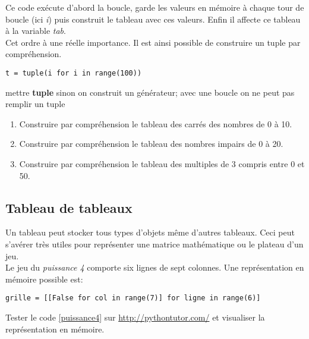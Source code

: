 \documentclass[a4paper,11pt]{article}
\begin{document}
\begin{Form}
Ce code exécute d'abord la boucle, garde les valeurs en mémoire à chaque tour de boucle (ici \emph{i}) puis construit le tableau avec ces valeurs. Enfin il affecte ce tableau à la variable \emph{tab}.\\
Cet ordre à une réelle importance. Il est ainsi possible de construire un tuple par compréhension.
\begin{code}[!h]
\begin{lstlisting}
t = tuple(i for i in range(100))	
\end{lstlisting}
\label{tuple}
\end{code}
\begin{commentprof}
mettre \textbf{tuple} sinon on construit un générateur; avec une boucle on ne peut pas remplir un tuple
\end{commentprof}
\begin{activite}
\begin{enumerate}
\item Construire par compréhension le tableau des carrés des nombres de 0 à 10.
\item Construire par compréhension le tableau des nombres impairs de 0 à 20.
\item Construire par compréhension le tableau des multiples de 3 compris entre 0 et 50.
\end{enumerate}
\end{activite}
\subsection{Tableau de tableaux}\label{tableau}
Un tableau peut stocker tous types d'objets même d'autres tableaux. Ceci peut s'avérer très utiles pour représenter une matrice mathématique ou le plateau d'un jeu.\\
Le jeu du \emph{puissance 4} comporte six lignes de sept colonnes. Une représentation en mémoire possible est:
\begin{code}[!h]
\begin{lstlisting}
grille = [[False for col in range(7)] for ligne in range(6)]
\end{lstlisting}
\label{puissance4}
\end{code}
\begin{activite}
Tester le code \ref{puissance4} sur \url{http://pythontutor.com/} et visualiser la représentation en mémoire.
\end{activite}

\end{Form}
\end{document}
